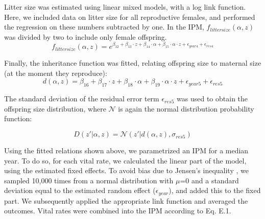 Litter size was estimated using linear mixed models, with a log link function. Here, we included data on litter size for all reproductive females, and performed the regression on these numbers subtracted by one. In the IPM, $f_{litter size}(\alpha,z)$ was divided by two to include only female offspring.
\begin{equation}
f_{litter size}(\alpha,z) = e^{\beta_{12} + \beta_{13} \cdot z + \beta_{14} \cdot \alpha + \beta_{15} \cdot \alpha \cdot z + \epsilon_{year4} + \epsilon_{res4}}
\end{equation}

Finally, the inheritance function was fitted, relating offspring size to maternal size (at the moment they reproduce):
\begin{equation}
d(\alpha,z) = \beta_{16} + \beta_{17} \cdot z + \beta_{18} \cdot \alpha + \beta_{19} \cdot \alpha \cdot z + \epsilon_{year5} + \epsilon_{res5}
\end{equation}

The standard deviation of the residual error term $\epsilon_{res5}$ was used to obtain the offspring size distribution, where $\mathcal{N}$ is again the normal distribution probability function:

\begin{equation}
D(z'|\alpha,z) = \mathcal{N}(z'|d(\alpha,z),\sigma_{res5})
\end{equation}

Using the fitted relations shown above, we parametrized an IPM for a median year. To do so, for each vital rate, we calculated the linear part of the model, using the estimated fixed effects. To avoid bias due to Jensen's inequality \citep[e.g.][]{Fox2002}, we sampled 10,000 times from a normal distribution with $\mu$=0 and a standard deviation equal to the estimated random effect ($\epsilon_{year}$), and added this to the fixed part. We subsequently applied the appropriate link function and averaged the outcomes. Vital rates were combined into the IPM according to Eq. E.1.




